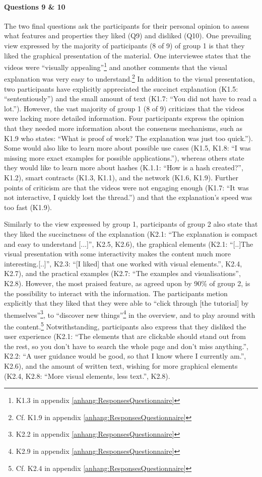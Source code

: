 \paragraph{Questions 9 \& 10}The two final questions ask the participants for their personal opinion to assess what features and properties they liked (Q9) and disliked (Q10). One prevailing view expressed by the majority of participants (8 of 9) of group 1 is that they liked the graphical presentation of the material. One interviewee states that the videos were \enquote{visually appealing}\footnote{K1.3 in appendix \ref{anhang:ResponsesQuestionnaire}} and another comments that the visual explanation was very easy to understand.\footnote{Cf. K1.9 in appendix \ref{anhang:ResponsesQuestionnaire}} In addition to the visual presentation, two participants have explicitly appreciated the succinct explanation (K1.5: \enquote{sententiously}) and the small amount of text (K1.7: \enquote{You did not have to read a lot.}). However, the vast majority of group 1 (8 of 9) criticizes that the videos were lacking more detailed information. Four participants express the opinion that they needed more information about the consensus mechanisms, such as K1.9 who states: \enquote{What is proof of work? The explanation was just too quick.}). Some would also like to learn more about possible use cases (K1.5, K1.8: \enquote{I was missing more exact examples for possible applications.}), whereas others state they would like to learn more about hashes (K.1.1: \enquote{How is a hash created?}, K1.2), smart contracts (K1.3, K1.1), and the network (K1.6, K1.9).
Further points of criticism are that the videos were not engaging enough (K1.7: \enquote{It was not interactive, I quickly lost the thread.}) and that the explanation's speed was too fast (K1.9).

Similarly to the view expressed by group 1, participants of group 2 also state that they liked the succinctness of the explanation (K2.1: \enquote{The explanation is compact and easy to understand [...]}, K2.5, K2.6), the graphical elements (K2.1: \enquote{[..]The visual presentation with some interactivity makes the content much more interesting.[..]}, K2.3: \enquote{[I liked] that one worked with visual elements.}, K2.4, K2.7), and the practical examples (K2.7: \enquote{The examples and visualisations}, K2.8). However, the most praised feature, as agreed upon by 90\% of group 2, is the possibility to interact with the information. The participants metion explicitly that they liked that they were able to \enquote{click through [the tutorial] by themselves}\footnote{K2.2 in appendix \ref{anhang:ResponsesQuestionnaire}}, to \enquote{discover new things}\footnote{K2.9 in appendix \ref{anhang:ResponsesQuestionnaire}} in the overview, and to play around with the content.\footnote{Cf. K2.4 in appendix \ref{anhang:ResponsesQuestionnaire}} Notwithstanding, participants also express that they disliked the user experience (K2.1: \enquote{The elements that are clickable should stand out from the rest, so you don't have to search the whole page and don't miss anything.}, K2.2: \enquote{A user guidance would be good, so that I know where I currently am.}, K2.6), and the amount of written text, wishing for more graphical elements (K2.4, K2.8: \enquote{More visual elements, less text.}, K2.8).

